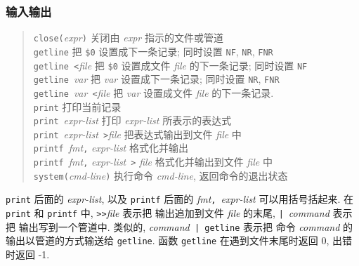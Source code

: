 \subsubsection{输入输出}
\begin{quote}
    \begin{tabbing}
        \texttt{close(}\textit{expr}\texttt{)}\hspace{8em} 
        \= 关闭由 \textit{expr}
        指示的文件或管道 \\
        \texttt{getline} \> 把 \verb'$0' 设置成下一条记录; 同时设置
        \texttt{NF}, \texttt{NR}, \texttt{FNR} \\

        \texttt{getline <}\textit{file} \> 把 \verb'$0' 设置成文件
        \textit{file} 的下一条记录; 同时设置 \texttt{NF} \\

        \texttt{getline}\ \textit{var} \> 把 \textit{var} 设置成下一条记录;
        同时设置 \texttt{NR}, \texttt{FNR} \\

        \texttt{getline}\ \textit{var}\ \texttt{<}\textit{file} \>  把
        \textit{var} 设置成文件  \textit{file} 的下一条记录. \\

        \texttt{print}  \> 打印当前记录 \\

        \texttt{print}\ \textit{expr-list} \> 打印 \textit{expr-list}
        所表示的表达式 \\

        \texttt{print}\ \textit{expr-list}\ \texttt{>}\textit{file} \>
        把表达式输出到文件 \textit{file} 中 \\

        \texttt{printf}\ \textit{fmt}\texttt{,} \textit{expr-list} \>
        格式化并输出 \\

        \texttt{printf}\ \textit{fmt}\texttt{,} \textit{expr-list}\ 
        \texttt{>} \textit{file}        \> 格式化并输出到文件 \textit{file}
        中 \\

        \texttt{system(}\textit{cmd-line}\texttt{)}     \> 执行命令
        \textit{cmd-line}, 返回命令的退出状态 \\
    \end{tabbing}
\end{quote}

\texttt{print} 后面的 \textit{expr-list}, 以及 \texttt{printf} 后面的
\textit{fmt}\texttt{,}\ \textit{expr-list} 可以用括号括起来. 在 
\texttt{print} 和 \texttt{printf} 中, \texttt{>>}\textit{file} 表示把
输出追加到文件 \textit{file} 的末尾, \texttt{|}\ \textit{command} 表示把
输出写到一个管道中. 类似的, \textit{command}\texttt{ | getline} 表示把
命令 \textit{command} 的输出以管道的方式输送给 \texttt{getline}. 函数
\texttt{getline} 在遇到文件末尾时返回 0, 出错时返回 -1.

